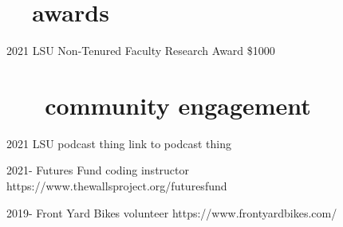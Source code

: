 \documentclass[]{CV}
\begin{document}
{%





\section{\faTrophy \ \ awards}
\begin{entrylist}

 \entry
 {2021}
 {LSU Non-Tenured Faculty Research Award}
 {\$1000}

\end{entrylist}











\section{ \faUserPlus \ \ \ community engagement}

\begin{entrylist}

 \entry
	 {2021}
	 {LSU podcast thing}
	 {link to podcast thing}
 

 \entry
	 {2021-}
	 {Futures Fund coding instructor}
	 {https://www.thewallsproject.org/futuresfund}

 \entry
	 {2019-}
	 {Front Yard Bikes volunteer}
	 {https://www.frontyardbikes.com/}



\end{entrylist}















}
\end{document}
